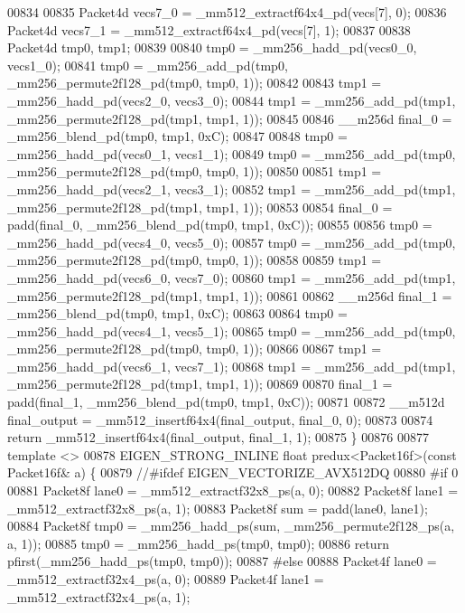 \begin{DoxyCode}
00834 
00835   Packet4d vecs7\_0 = \_mm512\_extractf64x4\_pd(vecs[7], 0);
00836   Packet4d vecs7\_1 = \_mm512\_extractf64x4\_pd(vecs[7], 1);
00837 
00838   Packet4d tmp0, tmp1;
00839 
00840   tmp0 = \_mm256\_hadd\_pd(vecs0\_0, vecs1\_0);
00841   tmp0 = \_mm256\_add\_pd(tmp0, \_mm256\_permute2f128\_pd(tmp0, tmp0, 1));
00842 
00843   tmp1 = \_mm256\_hadd\_pd(vecs2\_0, vecs3\_0);
00844   tmp1 = \_mm256\_add\_pd(tmp1, \_mm256\_permute2f128\_pd(tmp1, tmp1, 1));
00845 
00846   \_\_m256d final\_0 = \_mm256\_blend\_pd(tmp0, tmp1, 0xC);
00847 
00848   tmp0 = \_mm256\_hadd\_pd(vecs0\_1, vecs1\_1);
00849   tmp0 = \_mm256\_add\_pd(tmp0, \_mm256\_permute2f128\_pd(tmp0, tmp0, 1));
00850 
00851   tmp1 = \_mm256\_hadd\_pd(vecs2\_1, vecs3\_1);
00852   tmp1 = \_mm256\_add\_pd(tmp1, \_mm256\_permute2f128\_pd(tmp1, tmp1, 1));
00853 
00854   final\_0 = padd(final\_0, \_mm256\_blend\_pd(tmp0, tmp1, 0xC));
00855 
00856   tmp0 = \_mm256\_hadd\_pd(vecs4\_0, vecs5\_0);
00857   tmp0 = \_mm256\_add\_pd(tmp0, \_mm256\_permute2f128\_pd(tmp0, tmp0, 1));
00858 
00859   tmp1 = \_mm256\_hadd\_pd(vecs6\_0, vecs7\_0);
00860   tmp1 = \_mm256\_add\_pd(tmp1, \_mm256\_permute2f128\_pd(tmp1, tmp1, 1));
00861 
00862   \_\_m256d final\_1 = \_mm256\_blend\_pd(tmp0, tmp1, 0xC);
00863 
00864   tmp0 = \_mm256\_hadd\_pd(vecs4\_1, vecs5\_1);
00865   tmp0 = \_mm256\_add\_pd(tmp0, \_mm256\_permute2f128\_pd(tmp0, tmp0, 1));
00866 
00867   tmp1 = \_mm256\_hadd\_pd(vecs6\_1, vecs7\_1);
00868   tmp1 = \_mm256\_add\_pd(tmp1, \_mm256\_permute2f128\_pd(tmp1, tmp1, 1));
00869 
00870   final\_1 = padd(final\_1, \_mm256\_blend\_pd(tmp0, tmp1, 0xC));
00871 
00872   \_\_m512d final\_output = \_mm512\_insertf64x4(final\_output, final\_0, 0);
00873 
00874   \textcolor{keywordflow}{return} \_mm512\_insertf64x4(final\_output, final\_1, 1);
00875 \}
00876 
00877 \textcolor{keyword}{template} <>
00878 EIGEN\_STRONG\_INLINE \textcolor{keywordtype}{float} predux<Packet16f>(\textcolor{keyword}{const} Packet16f& a) \{
00879   \textcolor{comment}{//#ifdef EIGEN\_VECTORIZE\_AVX512DQ}
00880 \textcolor{preprocessor}{#if 0}
00881   Packet8f lane0 = \_mm512\_extractf32x8\_ps(a, 0);
00882   Packet8f lane1 = \_mm512\_extractf32x8\_ps(a, 1);
00883   Packet8f sum = padd(lane0, lane1);
00884   Packet8f tmp0 = \_mm256\_hadd\_ps(sum, \_mm256\_permute2f128\_ps(a, a, 1));
00885   tmp0 = \_mm256\_hadd\_ps(tmp0, tmp0);
00886   \textcolor{keywordflow}{return} pfirst(\_mm256\_hadd\_ps(tmp0, tmp0));
00887 \textcolor{preprocessor}{#else}
00888   Packet4f lane0 = \_mm512\_extractf32x4\_ps(a, 0);
00889   Packet4f lane1 = \_mm512\_extractf32x4\_ps(a, 1);

\end{DoxyCode}
